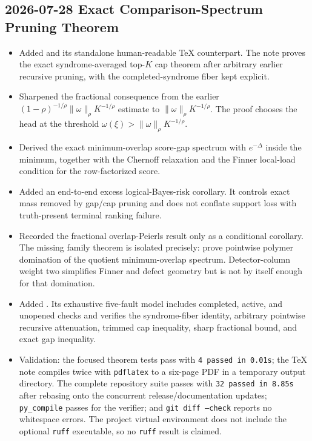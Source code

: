 \subsection*{2026-07-28 Exact Comparison-Spectrum Pruning Theorem}

\begin{itemize}
\item Added \texttt{} and its
standalone human-readable TeX counterpart. The note proves the exact
syndrome-averaged top-\(K\) cap theorem after arbitrary earlier recursive
pruning, with the completed-syndrome fiber kept explicit.
\item Sharpened the fractional consequence from the earlier
\((1-\rho)^{-1/\rho}\|\omega\|_\rho K^{-1/\rho}\) estimate to
\(\|\omega\|_\rho K^{-1/\rho}\). The proof chooses the head at the threshold
\(\omega(\xi)>\|\omega\|_\rho K^{-1/\rho}\).
\item Derived the exact minimum-overlap score-gap spectrum with
\(e^{-\Delta}\) inside the minimum, together with the Chernoff relaxation and
the Finner local-load condition for the row-factorized score.
\item Added an end-to-end excess logical-Bayes-risk corollary. It controls
exact mass removed by gap/cap pruning and does not conflate support loss with
truth-present terminal ranking failure.
\item Recorded the fractional overlap-Peierls result only as a conditional
corollary. The missing family theorem is isolated precisely: prove pointwise
polymer domination of the quotient minimum-overlap spectrum. Detector-column
weight two simplifies Finner and defect geometry but is not by itself enough
for that domination.
\item Added
\texttt{}. Its exhaustive
five-fault model includes completed, active, and unopened checks and verifies
the syndrome-fiber identity, arbitrary pointwise recursive attenuation,
trimmed cap inequality, sharp fractional bound, and exact gap inequality.
\item Validation: the focused theorem tests pass with \texttt{4 passed in
0.01s}; the TeX note compiles twice with \texttt{pdflatex} to a six-page PDF
in a temporary output directory. The complete repository suite passes with
\texttt{32 passed in 8.85s} after rebasing onto the concurrent
release/documentation updates; \texttt{py\_compile} passes for the verifier;
and \texttt{git diff --check} reports no whitespace errors. The project
virtual environment does not include the optional \texttt{ruff} executable,
so no \texttt{ruff} result is claimed.
\end{itemize}

